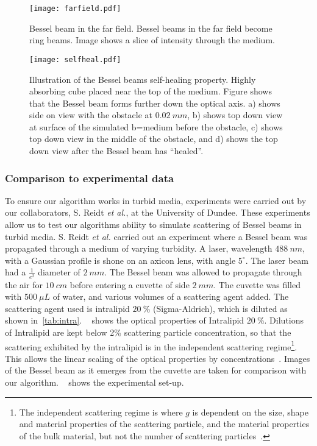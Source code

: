 \begin{figure}[!htbp]
\centering
\texttt{[image: farfield.pdf]}
\caption{Bessel beam in the far field. Bessel beams in the far field become ring beams. Image shows a slice of intensity through the medium.}
\label{fig:farfield}
\end{figure}

\begin{figure}[!htbp]
\centering
\texttt{[image: selfheal.pdf]}
\caption{Illustration of the Bessel beams self-healing property. Highly absorbing cube placed near the top of the medium. Figure shows that the Bessel beam forms further down the optical axis. a) shows side on view with the obstacle at $0.02~mm$, b) shows top down view at surface of the simulated b=medium before the obstacle, c) shows top down view in the middle of the obstacle, and  d) shows the top down view after the Bessel beam has ``healed''.}
\label{fig:selfheal}
\end{figure}

\FloatBarrier

\subsubsection*{Comparison to experimental data}

To ensure our algorithm works in turbid media, experiments were carried out by our collaborators, S. Reidt \textit{et al.}, at the University of Dundee.
These experiments allow us to test our algorithms ability to simulate scattering of Bessel beams in turbid media.
S. Reidt \textit{et al.} carried out an experiment where a Bessel beam was propagated through a medium of varying turbidity.
A laser, wavelength $488~nm$, with a Gaussian profile is shone on an axicon lens, with angle $5^{\circ}$.
The laser beam had a $\tfrac{1}{e^2}$ diameter of $2~mm$. 
The Bessel beam was allowed to propagate through the air for $10~cm$ before entering a cuvette of side $2~mm$.
The cuvette was filled with $500~\mu L$ of water, and various volumes of a scattering agent added.
The scattering agent used is intralipid $20~\%$ (Sigma-Aldrich), which is diluted as shown in~\cref{tab:intra}.
~ shows the optical properties of Intralipid $20~\%$.
Dilutions of Intralipid are kept below 2\% scattering particle concentration, so that the scattering exhibited by the intralipid is in the independent scattering regime\footnote{The independent scattering regime is where $g$ is dependent on the size, shape and material properties of the scattering particle, and the material properties of the bulk material, but not the number of scattering particles~\cite{aernouts2013supercontinuum,mishchenko2018independent}.}.
This allows the linear scaling of the optical properties by concentrations~\cite{aernouts2013supercontinuum,vardaki2015studying,di2011effect}.
Images of the Bessel beam as it emerges from the cuvette are taken for comparison with our algorithm.
~ shows the experimental set-up.


